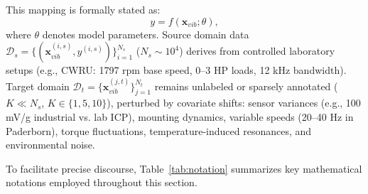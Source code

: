 This mapping is formally stated as:
\begin{equation}
y = f(\mathbf{x}_{vib}; \theta),
\label{eq:f1}
\end{equation}
where $\theta$ denotes model parameters. Source domain data $\mathcal{D}_s = \{(\mathbf{x}_{vib}^{(i,s)}, y^{(i,s)})\}_{i=1}^{N_s}$ ($N_s \sim 10^4$) derives from controlled laboratory setups (e.g., CWRU: 1797 rpm base speed, 0--3 HP loads, 12 kHz bandwidth). Target domain $\mathcal{D}_t = \{\mathbf{x}_{vib}^{(j,t)}\}_{j=1}^{N_t}$ remains unlabeled or sparsely annotated ($K \ll N_s$, $K\in\{1,5,10\}$), perturbed by covariate shifts: sensor variances (e.g., 100 mV/g industrial vs. lab ICP), mounting dynamics, variable speeds (20--40 Hz in Paderborn), torque fluctuations, temperature-induced resonances, and environmental noise.

To facilitate precise discourse, Table~\ref{tab:notation} summarizes key mathematical notations employed throughout this section.

